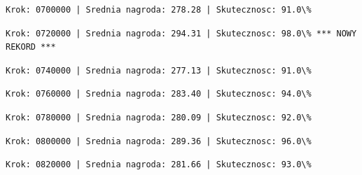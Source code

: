 \documentclass[11pt]{article}
\begin{document}
    
    
    \begin{Verbatim}[commandchars=\\\{\}]
Krok: 0700000 | Srednia nagroda: 278.28 | Skutecznosc: 91.0\%

    \end{Verbatim}

    
    
    \begin{Verbatim}[commandchars=\\\{\}]
Krok: 0720000 | Srednia nagroda: 294.31 | Skutecznosc: 98.0\% *** NOWY REKORD ***

    \end{Verbatim}

    
    
    \begin{Verbatim}[commandchars=\\\{\}]
Krok: 0740000 | Srednia nagroda: 277.13 | Skutecznosc: 91.0\%

    \end{Verbatim}

    
    
    \begin{Verbatim}[commandchars=\\\{\}]
Krok: 0760000 | Srednia nagroda: 283.40 | Skutecznosc: 94.0\%

    \end{Verbatim}

    
    
    \begin{Verbatim}[commandchars=\\\{\}]
Krok: 0780000 | Srednia nagroda: 280.09 | Skutecznosc: 92.0\%

    \end{Verbatim}

    
    
    \begin{Verbatim}[commandchars=\\\{\}]
Krok: 0800000 | Srednia nagroda: 289.36 | Skutecznosc: 96.0\%

    \end{Verbatim}

    
    
    \begin{Verbatim}[commandchars=\\\{\}]
Krok: 0820000 | Srednia nagroda: 281.66 | Skutecznosc: 93.0\%

    \end{Verbatim}
\end{document}
